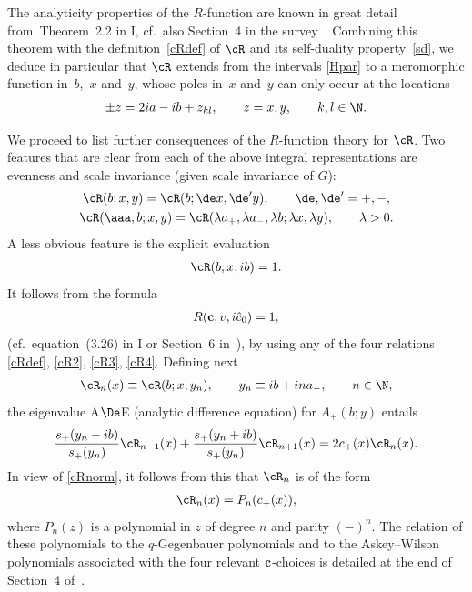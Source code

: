 The analyticity properties of the $R$-function are known in great detail from~Theorem~2.2 in I, cf.~also Section~4 in the survey~\cite{Rsurv}. Combining this theorem with the def\/inition~\eqref{cRdef} of $\cR$ and its self-duality property~\eqref{sd}, we deduce in particular that $\cR$ extends from the intervals \eqref{Hpar} to a meromorphic function in~$b$,~$x$ and~$y$, whose poles in~$x$ and~$y$ can only occur at the locations
\begin{gather}\label{cRpoles}
\pm z=2ia-ib+z_{kl},\qquad  z=x,y,\qquad k,l\in \N.
\end{gather}

We proceed to list further consequences of the $R$-function theory for $\cR$. Two features that are clear from each of the above integral representations are evenness and scale invariance (given scale invariance of $G$):
\begin{gather}\label{even}
\cR (b;x,y)=\cR(b;\de x, \de'y),\qquad \de,\de'=+,-,
\\
\label{scale}
\cR(\aaa,b;x,y)=\cR(\lambda  a_{+},\lambda a_{-}, \lambda b;\lambda x,\lambda y),\qquad \lambda>0.
\end{gather}
A less obvious feature is the explicit evaluation
\begin{gather}\label{cRnorm}
\cR(b;x,ib)=1.
\end{gather}
It follows from the formula
\begin{gather}
R({\bf c};v,i\hat{c}_0)=1,
\end{gather}
(cf.~equation~(3.26) in I or Section~6 in~\cite{Rsurv}), by using any of the four relations \eqref{cRdef}, \eqref{cR2}, \eqref{cR3}, \eqref{cR4}.
Def\/ining next
\begin{gather}
\cR_n(x)\equiv \cR(b;x,y_n),\qquad y_n\equiv ib+ina_{-},\qquad n\in\N,
\end{gather}
the eigenvalue A$\De$E (analytic dif\/ference equation) for $A_{+}(b;y)$ entails
\begin{gather}
 \frac{s_{+}(y_n-ib)}{s_{+}(y_n)}\cR_{n-1}(x)+\frac{s_{+}(y_n+ib)}{s_{+}(y_n)}\cR_{n+1}(x)=2c_{+}(x)\cR_n(x).
\end{gather}
In view of \eqref{cRnorm}, it follows from this that $\cR_n$ is of the form
\begin{gather}\label{qGeg}
\cR_n(x)=P_n(c_{+}(x)),
\end{gather}
where $P_n(z)$ is a polynomial in $z$ of degree $n$ and parity $(-)^n$. The relation of these polynomials to the $q$-Gegenbauer polynomials and to the  Askey--Wilson polynomials associated with the four relevant ${\bf c}$-choices is detailed at the end of Section~4 of~\cite{quad}.

